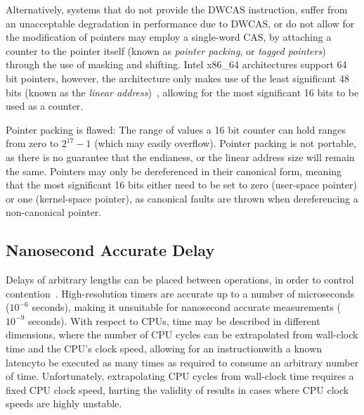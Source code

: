 Alternatively, systems that do not provide the DWCAS instruction, suffer from
an unacceptable degradation in performance due to DWCAS, or do not allow for
the modification of pointers may employ a single-word CAS, by attaching a
counter to the pointer itself (known as \emph{pointer packing}, or \emph{tagged
pointers}) through the use of masking and shifting. Intel x86\_64 architectures support 64 bit pointers, however, the
architecture only makes use of the least significant 48 bits (known as the
\emph{linear address})~\citep[Section~3.3.7.1]{intel2021system}, allowing for
the most significant 16 bits to be used as a counter.

Pointer packing is flawed: 
The range of values a 16 bit counter can hold ranges from zero to $2^{17}-1$
(which may easily overflow).
Pointer packing is not portable, as there is no guarantee that the endianess,
or the linear address size will remain the same. 
Pointers may only be dereferenced in their canonical form, meaning that the
most significant 16 bits either need to be set to zero (user-space pointer) or
one (kernel-space pointer), as canonical faults are thrown when
dereferencing a non-canonical pointer.

\subsection{Nanosecond Accurate Delay}
Delays of arbitrary lengths can be placed between operations, in order to
control contention~\citep{valois1994queues}. High-resolution timers are
accurate up to a number of microseconds ($10^{-6}$ seconds), making it
unsuitable for nanosecond accurate measurements ($10^{-9}$ seconds). 
With respect to CPUs, time may be described in different dimensions, where the
number of CPU cycles can be extrapolated from wall-clock time and the CPU's
clock speed, allowing for an instruction\textemdash with a known
latency\textemdash to be executed as many times as required to consume an
arbitrary number of time. Unfortunately, extrapolating CPU cycles from
wall-clock time requires a fixed CPU clock speed, hurting the validity of
results in cases where CPU clock speeds are highly unstable.

